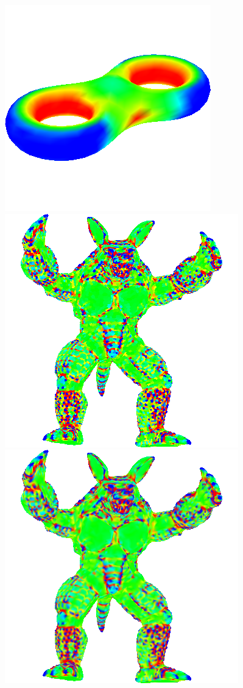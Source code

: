 \begin{figure}[!h]
    \endminipage\hfill
    \centering
    \includegraphics[scale=0.75]{images/gci-eight.png}
    \endminipage\hfill
    \centering
    \includegraphics[scale=0.75]{images/gc-armadillo.png}
    \endminipage\hfill
    \centering
    \includegraphics[scale=0.75]{images/gci-armadillo.png}

\end{figure}
